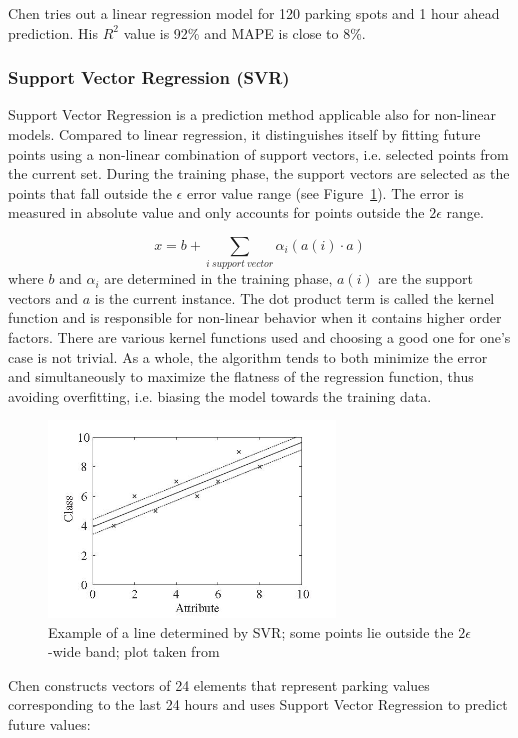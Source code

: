 \documentclass{article}
\begin{document}
\vspace{2mm}
Chen\cite{Chen} tries out a linear regression model for 120 parking spots and 1 hour ahead prediction. His $R^2$ value is 92\% and MAPE is close to 8\%.

\subsubsection{Support Vector Regression (SVR)}
Support Vector Regression is a prediction method applicable also for non-linear models. Compared to linear regression, it distinguishes itself by fitting future points using a non-linear combination of support vectors, i.e. selected points from the current set. During the training phase, the support vectors are selected as the points that fall outside the $\epsilon$ error value range (see Figure~\ref{fig:svr}). The error is measured in absolute value and only accounts for points outside the $2\epsilon$ range. 

$$x = b + \sum_{i\:support\:vector} \alpha_i (a(i) \cdot a)  $$
where $b$ and $\alpha_i$ are determined in the training phase, $a(i)$ are the support vectors and $a$ is the current instance.  The dot product term is called the kernel function and is responsible for non-linear behavior when it contains higher order factors. There are various kernel functions used and choosing a good one for one's case is not trivial. As a whole, the algorithm tends to both minimize the error and simultaneously to maximize the flatness of the regression function, thus avoiding overfitting, i.e. biasing the model towards the training data.

\begin{figure}[!ht]
    \centering
    \includegraphics[width=3.0in]{svr}
    \caption{Example of a line determined by SVR; some points lie outside the $2\epsilon$-wide band; plot taken from \cite{Witten} }
    \label{fig:svr}
\end{figure}

\vspace{2mm}
Chen\cite{Chen} constructs vectors of 24 elements that represent parking values corresponding to the last 24 hours and uses Support Vector Regression to predict future values:
\end{document}
